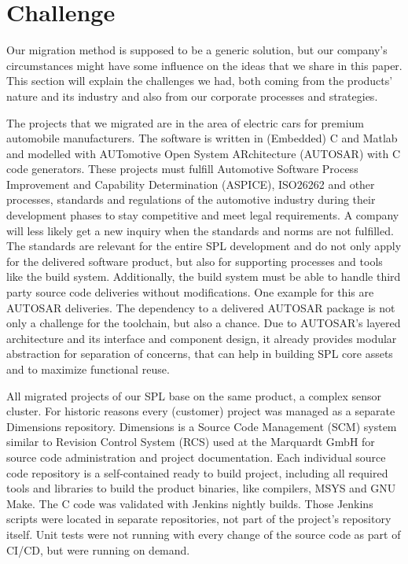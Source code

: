\section{Challenge}

Our migration method is supposed to be a generic solution, but our company's
circumstances might have some influence on the ideas that we share in this
paper. This section will explain the challenges we had, both coming from the
products' nature and its industry and also from our corporate processes and
strategies.

The projects that we migrated are in the area of electric cars for premium
automobile manufacturers. The software is written in (Embedded) C and Matlab and
modelled with AUTomotive Open System ARchitecture (AUTOSAR) with C code
generators. These projects must fulfill Automotive Software Process Improvement
and Capability Determination (ASPICE), ISO26262 and other processes, standards
and regulations of the automotive industry during their development phases to
stay competitive and meet legal requirements. A company will less likely get a
new inquiry when the standards and norms are not fulfilled. The standards are
relevant for the entire SPL development and do not only apply for the delivered
software product, but also for supporting processes and tools like the build
system. Additionally, the build system must be able to handle third party source
code deliveries without modifications. One example for this are AUTOSAR
deliveries. The dependency to a delivered AUTOSAR package is not only a
challenge for the toolchain, but also a chance. Due to AUTOSAR's layered
architecture and its interface and component design, it already provides modular
abstraction for separation of concerns, that can help in building SPL core
assets and to maximize functional reuse.

All migrated projects of our SPL base on the same product, a complex sensor
cluster. For historic reasons every (customer) project was managed as a separate
Dimensions repository. Dimensions is a Source Code Management (SCM) system
similar to Revision Control System (RCS) used at the Marquardt GmbH for source
code administration and project documentation. Each individual source code
repository is a self-contained ready to build project, including all required
tools and libraries to build the product binaries, like compilers, MSYS and GNU
Make. The C code was validated with Jenkins nightly builds. Those Jenkins
scripts were located in separate repositories, not part of the project's
repository itself. Unit tests were not running with every change of the source
code as part of CI/CD, but were running on demand.

